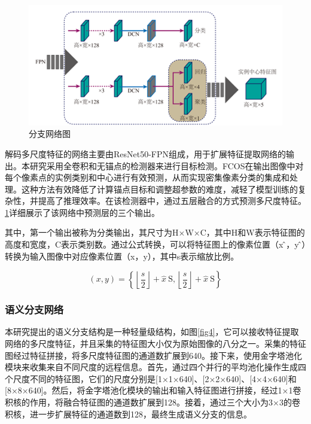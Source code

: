 \begin{figure}[!h] %
    \centering %
    \includegraphics[scale=0.8]{fig/chap2/图片3.png} %
    \caption{分支网络图}
    \label{fig3} %
    \end{figure}
解码多尺度特征的网络主要由ResNet50-FPN组成，用于扩展特征提取网络的输出。本研究采用全卷积和无锚点的检测器来进行目标检测。FCOS在输出图像中对每个像素点的实例类别和中心进行有效预测，从而实现密集像素分类的集成和处理。这种方法有效降低了计算锚点目标和调整超参数的难度，减轻了模型训练的复杂性，并提高了推理效率。在该检测器中，通过五层融合的方式预测多尺度特征。\cref*{fig3}详细展示了该网络中预测层的三个输出。


其中，第一个输出被称为分类输出，其尺寸为H×W×C，其中H和W表示特征图的高度和宽度，C表示类别数。通过公式转换，可以将特征图上的像素位置（x ̂，y ̂）转换为输入图像中对应像素位置（x，y），其中s表示缩放比例。

\begin{equation}
    (x, y)=\left\{\left\lfloor\frac{s}{2}\right\rfloor+\widehat{x} \mathrm{~S},\left\lfloor\frac{s}{2}\right\rfloor+\widehat{x} \mathrm{~S}\right\}
    \label{eqk2}
    \end{equation}

\subsubsection{语义分支网络}
本研究提出的语义分支结构是一种轻量级结构，如图\cref*{fig4}，它可以接收特征提取网络的多尺度特征，并且采集的特征图大小仅为原始图像的八分之一。采集的特征图经过特征拼接，将多尺度特征图的通道数扩展到640。接下来，使用金字塔池化模块来收集来自不同尺度的远程信息。首先，通过四个并行的平均池化操作生成四个尺度不同的特征图，它们的尺度分别是[1×1×640]、[2×2×640]、[4×4×640]和[8×8×640]。然后，将金字塔池化模块的输出和输入特征图进行拼接，经过1×1卷积核的作用，将融合特征图的通道数扩展到128。接着，通过三个大小为3×3的卷积核，进一步扩展特征的通道数到128，最终生成语义分支的信息。

